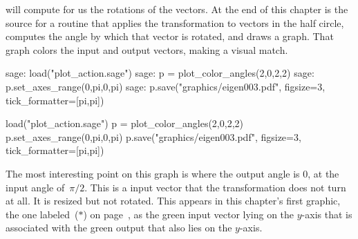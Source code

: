 \Sage{} will compute for us the rotations of the vectors.
At the end of this chapter is the source for a routine 
 that
applies the transformation to vectors in the 
half circle, 
computes the angle by which that
vector is rotated, and draws a graph. 
That graph colors the input and output vectors,
making a visual match.
\begin{sagecommandline}
sage: load("plot_action.sage")  
sage: p = plot_color_angles(2,0,2,2)
sage: p.set_axes_range(0,pi,0,pi)
sage: p.save("graphics/eigen003.pdf", figsize=3, tick_formatter=[pi,pi])
\end{sagecommandline}
\begin{sagesilent}
load("plot_action.sage")  
p = plot_color_angles(2,0,2,2)
p.set_axes_range(0,pi,0,pi)
p.save("graphics/eigen003.pdf", figsize=3, tick_formatter=[pi,pi])
\end{sagesilent}
\begin{center}
\end{center}
The most interesting point on this graph is where the output angle is $0$,
at the input angle of~$\pi/2$.
This is a input vector that the transformation does not turn at all. 
It is resized but not rotated.
This appears in this chapter's first graphic, the one labeled~($*$)
on page~\pageref{gr:firstgraphic}, 
as the green input vector lying on the $y$-axis
that is associated with the green output that also lies on the $y$-axis.




